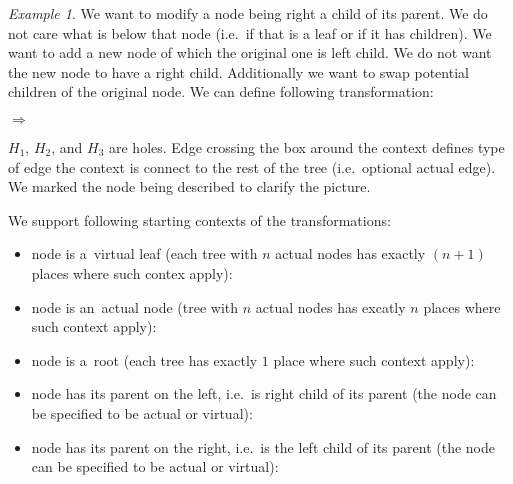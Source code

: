 \documentclass[final]{article}
\theoremstyle{definition}
\theoremstyle{definition}
\theoremstyle{remark}
\newtheorem{example}{Example}[subsection]
\newcommand{\includeinlinescaledsvg}[3]{\begin{minipage}{#1\textwidth}\begin{center}\end{center}\end{minipage}}
\begin{document}
\begin{example}%
    \label{ex:transformation}%
    We want to modify a node being right a child of its parent. We do not care what is below that node (i.e.~if that is a leaf or if it has children). We want to add a new node of which the original one is left child. We do not want the new node to have a right child. Additionally we want to swap potential children of the original node. We can define following transformation:
    \begin{center}
        \includeinlinescaledsvg{.4}{.7}{lambda__contexts__def_001}%
        \(\Rightarrow\)
        \includeinlinescaledsvg{.4}{.7}{lambda__contexts__def_002}%
    \end{center}
\end{example}

\(H_1\), \(H_2\), and \(H_3\) are holes. Edge crossing the box around the context defines type of edge the context is connect to the rest of the tree (i.e.~optional actual edge). We marked the node being described to clarify the picture.

We support following starting contexts of the transformations:

\begin{itemize}
    \item node is a~virtual leaf (each tree with \(n\) actual nodes has exactly \((n + 1)\) places where such contex apply):\\
        \includeinlinescaledsvg{1}{.7}{lambda__contexts__type_001}%
    \item node is an~actual node (tree with \(n\) actual nodes has excatly \(n\) places where such context apply):\\
        \includeinlinescaledsvg{1}{.7}{lambda__contexts__type_002}%
    \item node is a~root (each tree has exactly \(1\) place where such context apply):\\
        \includeinlinescaledsvg{1}{.7}{lambda__contexts__type_003}%
    \item node has its parent on the left, i.e.~is right child of its parent (the node can be specified to be actual or virtual):\\
        \includeinlinescaledsvg{.5}{.7}{lambda__contexts__type_004}%
        \includeinlinescaledsvg{.5}{.7}{lambda__contexts__type_004b}%
    \item node has its parent on the right, i.e.~is the left child of its parent (the node can be specified to be actual or virtual):\\
        \includeinlinescaledsvg{.5}{.7}{lambda__contexts__type_005}%
        \includeinlinescaledsvg{.5}{.7}{lambda__contexts__type_005b}%
\end{itemize}
\end{document}
